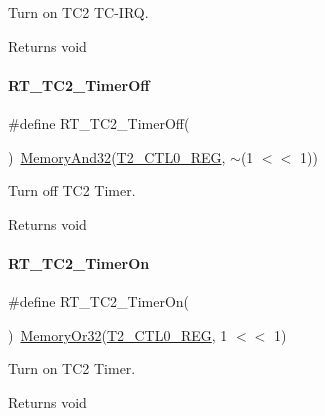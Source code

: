 Turn on T\+C2 T\+C-\/\+I\+RQ. 

\begin{DoxyReturn}{Returns}
void 
\end{DoxyReturn}
\mbox{\label{a00047_a4328299fe0323ef75508eadf9b937ba1}} 
\paragraph{\texorpdfstring{R\+T\+\_\+\+T\+C2\+\_\+\+Timer\+Off}{RT\_TC2\_TimerOff}}
{\footnotesize\ttfamily \#define R\+T\+\_\+\+T\+C2\+\_\+\+Timer\+Off(\begin{DoxyParamCaption}{ }\end{DoxyParamCaption})~\mbox{\hyperlink{a00020_ad87cedffcaadc51db22594fce55173d4}{Memory\+And32}}(\mbox{\hyperlink{a00020_adadaa0ab1ebbd7ba9b70dfd24c3ed44daf2e9deb36631241181cbf09e8d959475}{T2\+\_\+\+C\+T\+L0\+\_\+\+R\+EG}}, $\sim$(1 $<$$<$ 1))}



Turn off T\+C2 Timer. 

\begin{DoxyReturn}{Returns}
void 
\end{DoxyReturn}
\mbox{\label{a00047_ab274ee44af2080d68745b2ec3af06648}} 
\paragraph{\texorpdfstring{R\+T\+\_\+\+T\+C2\+\_\+\+Timer\+On}{RT\_TC2\_TimerOn}}
{\footnotesize\ttfamily \#define R\+T\+\_\+\+T\+C2\+\_\+\+Timer\+On(\begin{DoxyParamCaption}{ }\end{DoxyParamCaption})~\mbox{\hyperlink{a00020_a27874a97deab7cecdde5ddecf466e31e}{Memory\+Or32}}(\mbox{\hyperlink{a00020_adadaa0ab1ebbd7ba9b70dfd24c3ed44daf2e9deb36631241181cbf09e8d959475}{T2\+\_\+\+C\+T\+L0\+\_\+\+R\+EG}}, 1 $<$$<$ 1)}



Turn on T\+C2 Timer. 

\begin{DoxyReturn}{Returns}
void 
\end{DoxyReturn}
\mbox{\label{a00047_a005265e28d070ee73720939fca9a815a}} 
